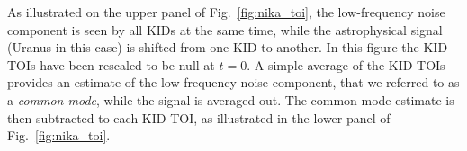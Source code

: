 %

As illustrated on the upper panel of Fig.~\ref{fig:nika_toi}, the
low-frequency noise component is seen by all KIDs at the same time,
while the astrophysical signal {\lp (Uranus in this case)} is shifted
from one KID to another.
{\lp In this figure the KID TOIs have been rescaled to be null
at $t=0$.} 
A simple average of the KID TOIs provides an
estimate of the low-frequency noise component, that we referred to as
a \emph{common mode}, while the signal is averaged out. The common mode
estimate is then subtracted to each KID TOI, as illustrated in
the lower panel of Fig.~\ref{fig:nika_toi}.


